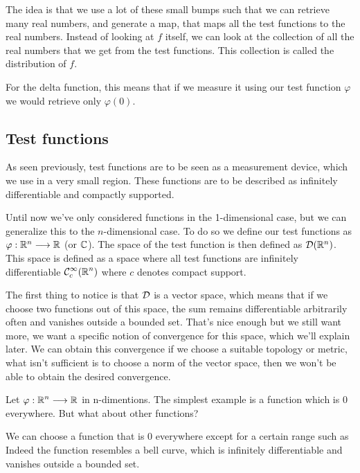 \documentclass[11pt, openright]{book}
\begin{document}
\begin{example}
    The idea is that we use a lot of these small bumps  such that we can retrieve many real numbers, and generate a map, that maps all the test functions to the real numbers. Instead of looking at $f$ itself, we can look at the collection of all the real numbers that we get from the test functions. This collection is called the distribution of $f$.

    For the delta function, this means that if we measure it using our test function $\varphi$ we would retrieve only $\varphi(0)$.

\end{example}

\subsection{Test functions}

As seen previously, test functions are to be seen as a measurement device, which we use in a very small region. These functions are to be described as infinitely differentiable and compactly supported.

Until now we've only considered functions in the 1-dimensional case, but we can generalize this to the $n$-dimensional case. To do so we define our test functions as $\varphi: \mathbb{R}^n \longrightarrow \mathbb{R} $ (or $\mathbb{C}$). The space of the test function is then defined as $\mathcal{D}(\mathbb{R}^n)$. This space is defined as a space where all test functions are infinitely differentiable $\displaystyle{\mathcal{C}^{\infty}_{c}(\mathbb{R}^n)}$ where $c$ denotes compact support.

The first thing to notice is that $\displaystyle{\mathcal{D}}$ is a vector space, which means that if we choose two functions out of this space, the sum remains differentiable arbitrarily often and vanishes outside a bounded set. That's nice enough but we still want more, we want a specific notion of convergence for this space, which we'll explain later. We can obtain this convergence if we choose a suitable topology or metric, what isn't sufficient is to choose a norm of the vector space, then we won't be able to obtain the desired convergence.

\begin{example}
    Let $\displaystyle{\varphi:\mathbb{R}^n \longrightarrow \mathbb{R}}$ in n-dimentions. The simplest example is a function which is 0 everywhere. But what about other functions?

    We can choose a function that is 0 everywhere except for a certain range such as
    Indeed the function resembles a bell curve, which is infinitely differentiable and vanishes outside a bounded set.
\end{example}
\end{document}
